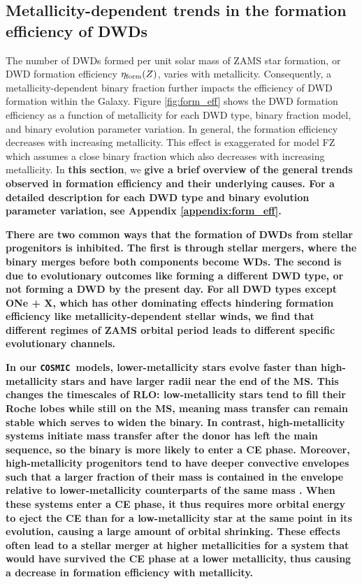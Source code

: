 \documentclass[twocolumn, linenumbers]{aastex631}
\newcommand{\cosmic}{\texttt{COSMIC}}
\begin{document}
\subsection{Metallicity-dependent trends in the formation efficiency of DWDs}\label{sec:formeff}
The number of DWDs formed per unit solar mass of ZAMS star formation, or DWD formation efficiency $\eta_{\rm{form}}(Z)$, varies with metallicity. Consequently, a metallicity-dependent binary fraction further impacts the efficiency of DWD formation within the Galaxy. Figure \ref{fig:form_eff} shows the DWD formation efficiency as a function of metallicity for each DWD type, binary fraction model, and binary evolution parameter variation. In general, the formation efficiency decreases with increasing metallicity. This effect is exaggerated for model FZ which assumes a close binary fraction which also decreases with increasing metallicity. In \textbf{this section}, we \textbf{give a brief overview of the general trends observed in formation efficiency and their underlying causes. For a detailed description for each DWD type and binary evolution parameter variation, see Appendix \ref{appendix:form_eff}.}

\textbf{There are two common ways that the formation of DWDs from stellar progenitors is inhibited. The first is through stellar mergers, where the binary merges before both components become WDs. The second is due to evolutionary outcomes like forming a different DWD type, or not forming a DWD by the present day. For all DWD types except ONe + X, which has other dominating \textbf{effects} hindering formation efficiency like metallicity-dependent stellar winds, we find that different regimes of ZAMS orbital period leads to different specific evolutionary channels.}

\textbf{In our \cosmic\ models, lower-metallicity stars evolve faster than high-metallicity stars and have larger radii near the end of the MS. This changes the timescales of RLO: low-metallicity stars tend to fill their Roche lobes while still on the MS, meaning mass transfer can remain stable which serves to widen the binary. In contrast, high-metallicity systems initiate mass transfer after the donor has left the main sequence, so the binary is more likely to enter a CE phase. Moreover, high-metallicity progenitors tend to have deeper convective envelopes such that a larger fraction of their mass is contained in the envelope relative to lower-metallicity counterparts of the same mass \citep{Amard2019, Amard2020}. When these systems enter a CE phase, it thus requires more orbital energy to eject the CE than for a low-metallicity star at the same point in its evolution, causing a large amount of orbital shrinking. These effects often lead to a stellar merger at higher metallicities for a system that would have survived the CE phase at a lower metallicity, thus causing a decrease in formation efficiency with metallicity.} 
\end{document}

